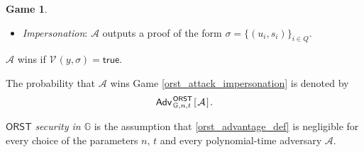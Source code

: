 \documentclass[psamsfonts, reqno]{amsart}
\theoremstyle{definition}
\newtheorem{attack_game}[thm]{Game}
\theoremstyle{remark}
\numberwithin{equation}{section}
\begin{document}
\begin{attack_game}
\begin{itemize}[label=$\bullet$,leftmargin=20pt,rightmargin=0pt]
		$\mathcal{C}$ samples
		$u_i \leftarrow_\$ \mathbb{G},\hspace{2pt} i \in J$
		and sends $\{u_i\}_{i \in J}$
		to $\mathcal{A}$.\vspace{3pt}
	\item \textit{Impersonation}:
		$\mathcal{A}$ outputs a proof of the form
		$\sigma = \{(u_i, s_i)\}_{i \in Q}$.
\end{itemize}
\hspace*{5pt}%
\begin{minipage}{\dimexpr\textwidth-\parindent\relax}%
\vspace{7pt}
\hspace{3pt}
$\mathcal{A}$ wins if
$\mathcal{V}\hspace{1pt}(y, \sigma) = \textsf{true}$.
\end{minipage}%
\vspace{6pt}
\end{attack_game}

\noindent
The probability that  $\mathcal{A}$ wins
Game \ref{orst_attack_impersonation}
is denoted by
\vspace{5pt}
\begin{equation}\label{orst_advantage_def}
\mathsf{Adv}
	_{\hspace{1pt}\mathbb{G},\hspace{0pt} n,\hspace{0pt} t}
	^{\hspace{1pt}\mathsf{ORST}}
	\hspace{1pt}
		[\hspace{1pt}
			\mathcal{A}
		\hspace{1pt}]\hspace{1pt}.
\vspace{5pt}
\end{equation}

\noindent
$\mathsf{ORST}$ \textit{security in $\mathbb{G}$}
is the assumption that \eqref{orst_advantage_def}
is negligible for every choice of the parameters
$n,\hspace{2pt} t$ and every polynomial-time adversary $\mathcal{A}$.
\end{document}
